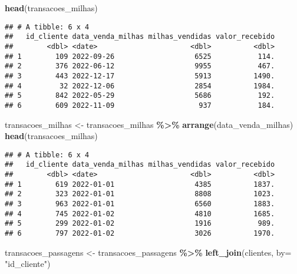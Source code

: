 \documentclass[
]{article}
\newenvironment{Shaded}{\begin{snugshade}}{\end{snugshade}}
\newcommand{\AttributeTok}[1]{\textcolor[rgb]{0.13,0.29,0.53}{#1}}
\newcommand{\FunctionTok}[1]{\textcolor[rgb]{0.13,0.29,0.53}{\textbf{#1}}}
\newcommand{\NormalTok}[1]{#1}
\newcommand{\OtherTok}[1]{\textcolor[rgb]{0.56,0.35,0.01}{#1}}
\newcommand{\SpecialCharTok}[1]{\textcolor[rgb]{0.81,0.36,0.00}{\textbf{#1}}}
\newcommand{\StringTok}[1]{\textcolor[rgb]{0.31,0.60,0.02}{#1}}
\begin{document}
\begin{Shaded}
\begin{Highlighting}[]
\FunctionTok{head}\NormalTok{(transacoes\_milhas)}
\end{Highlighting}
\end{Shaded}

\begin{verbatim}
## # A tibble: 6 x 4
##   id_cliente data_venda_milhas milhas_vendidas valor_recebido
##        <dbl> <date>                      <dbl>          <dbl>
## 1        109 2022-09-26                   6525           114.
## 2        376 2022-06-12                   9955           467.
## 3        443 2022-12-17                   5913          1490.
## 4         32 2022-12-06                   2854          1984.
## 5        842 2022-05-29                   5686           192.
## 6        609 2022-11-09                    937           184.
\end{verbatim}

\begin{Shaded}
\begin{Highlighting}[]
\NormalTok{transacoes\_milhas }\OtherTok{\textless{}{-}}\NormalTok{ transacoes\_milhas }\SpecialCharTok{\%\textgreater{}\%} \FunctionTok{arrange}\NormalTok{(data\_venda\_milhas)}
\FunctionTok{head}\NormalTok{(transacoes\_milhas)}
\end{Highlighting}
\end{Shaded}

\begin{verbatim}
## # A tibble: 6 x 4
##   id_cliente data_venda_milhas milhas_vendidas valor_recebido
##        <dbl> <date>                      <dbl>          <dbl>
## 1        619 2022-01-01                   4385          1837.
## 2        323 2022-01-01                   8808          1023.
## 3        963 2022-01-01                   6560          1883.
## 4        745 2022-01-02                   4810          1685.
## 5        299 2022-01-02                   1916           989.
## 6        797 2022-01-02                   3026          1970.
\end{verbatim}

\begin{Shaded}
\begin{Highlighting}[]
\NormalTok{transacoes\_passagens }\OtherTok{\textless{}{-}}\NormalTok{ transacoes\_passagens }\SpecialCharTok{\%\textgreater{}\%} \FunctionTok{left\_join}\NormalTok{(clientes, }\AttributeTok{by=} \StringTok{"id\_cliente"}\NormalTok{)}
\end{Highlighting}
\end{Shaded}
\end{document}
